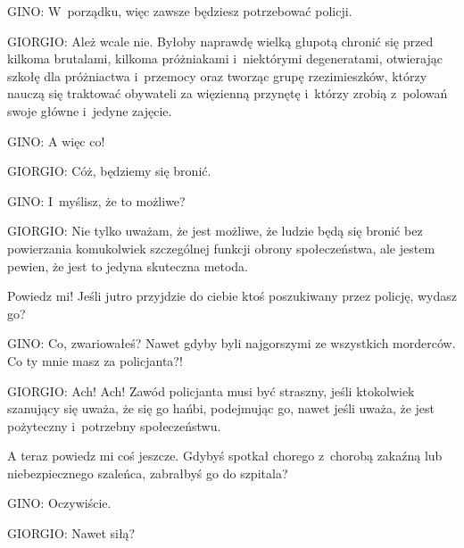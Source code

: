 \documentclass[oneside,polish,11pt,sfheadings]{mwbk}
\begin{document}
 
\noindent \noindent GINO: W~porządku, więc zawsze będziesz potrzebować policji. 




 
\noindent GIORGIO: Ależ wcale nie. Byłoby naprawdę wielką głupotą chronić się przed kilkoma brutalami, kilkoma próżniakami i~niektórymi degeneratami, otwierając szkołę dla próżniactwa i~przemocy oraz tworząc grupę rzezimieszków, którzy nauczą
się traktować obywateli za więzienną przynętę i~którzy zrobią z~polowań swoje główne i~jedyne zajęcie. 




 
\noindent \noindent GINO: A więc co! 




 
\noindent GIORGIO: Cóż, będziemy się bronić. 




 
\noindent \noindent GINO: I~myślisz, że to możliwe? 




 
\noindent GIORGIO: Nie tylko uważam, że jest możliwe, że ludzie będą się bronić bez powierzania komukolwiek szczególnej funkcji
obrony społeczeństwa, ale jestem pewien, że jest to jedyna skuteczna metoda. 

 
Powiedz mi! Jeśli jutro przyjdzie do ciebie ktoś poszukiwany przez policję, wydasz go? 




 
\noindent \noindent GINO: Co, zwariowałeś? Nawet gdyby byli najgorszymi ze wszystkich morderców. Co ty mnie masz za policjanta?! 




 
\noindent GIORGIO: Ach! Ach! Zawód policjanta musi być straszny, jeśli ktokolwiek szanujący się uważa, że  się go
hańbi, podejmując go, nawet jeśli uważa, że jest pożyteczny i~potrzebny społeczeństwu. 

 
A teraz powiedz mi coś jeszcze. Gdybyś spotkał chorego z~chorobą zakaźną lub niebezpiecznego szaleńca, zabrałbyś go do
szpitala? 




 
\noindent \noindent GINO: Oczywiście. 




 
\noindent GIORGIO: Nawet siłą? 
\end{document}

